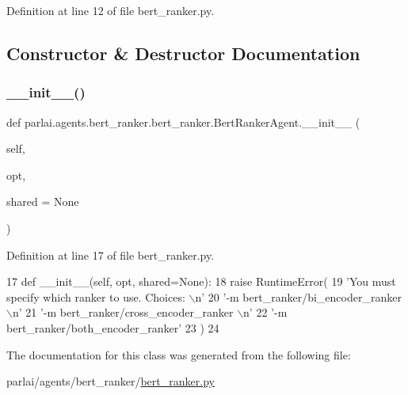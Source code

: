 Definition at line 12 of file bert\+\_\+ranker.\+py.



\subsection{Constructor \& Destructor Documentation}
\mbox{\label{classparlai_1_1agents_1_1bert__ranker_1_1bert__ranker_1_1BertRankerAgent_a1df3920ae23af044ca5abab9b0c46b10}} 
\subsubsection{\texorpdfstring{\+\_\+\+\_\+init\+\_\+\+\_\+()}{\_\_init\_\_()}}
{\footnotesize\ttfamily def parlai.\+agents.\+bert\+\_\+ranker.\+bert\+\_\+ranker.\+Bert\+Ranker\+Agent.\+\_\+\+\_\+init\+\_\+\+\_\+ (\begin{DoxyParamCaption}\item[{}]{self,  }\item[{}]{opt,  }\item[{}]{shared = {\ttfamily None} }\end{DoxyParamCaption})}



Definition at line 17 of file bert\+\_\+ranker.\+py.


\begin{DoxyCode}
17     \textcolor{keyword}{def }\_\_init\_\_(self, opt, shared=None):
18         \textcolor{keywordflow}{raise} RuntimeError(
19             \textcolor{stringliteral}{'You must specify which ranker to use. Choices: \(\backslash\)n'}
20             \textcolor{stringliteral}{'-m bert\_ranker/bi\_encoder\_ranker \(\backslash\)n'}
21             \textcolor{stringliteral}{'-m bert\_ranker/cross\_encoder\_ranker \(\backslash\)n'}
22             \textcolor{stringliteral}{'-m bert\_ranker/both\_encoder\_ranker'}
23         )
24 \end{DoxyCode}


The documentation for this class was generated from the following file\+:\begin{DoxyCompactItemize}
\item 
parlai/agents/bert\+\_\+ranker/\hyperlink{bert__ranker_8py}{bert\+\_\+ranker.\+py}\end{DoxyCompactItemize}
